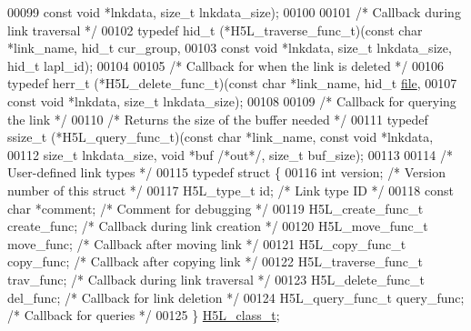 \begin{DoxyCode}
00099     \textcolor{keyword}{const} \textcolor{keywordtype}{void} *lnkdata, \textcolor{keywordtype}{size\_t} lnkdata\_size);
00100 
00101 \textcolor{comment}{/* Callback during link traversal */}
00102 \textcolor{keyword}{typedef} hid\_t (*H5L\_traverse\_func\_t)(\textcolor{keyword}{const} \textcolor{keywordtype}{char} *link\_name, hid\_t cur\_group,
00103     \textcolor{keyword}{const} \textcolor{keywordtype}{void} *lnkdata, \textcolor{keywordtype}{size\_t} lnkdata\_size, hid\_t lapl\_id);
00104 
00105 \textcolor{comment}{/* Callback for when the link is deleted */}
00106 \textcolor{keyword}{typedef} herr\_t (*H5L\_delete\_func\_t)(\textcolor{keyword}{const} \textcolor{keywordtype}{char} *link\_name, hid\_t \hyperlink{structfile}{file},
00107     \textcolor{keyword}{const} \textcolor{keywordtype}{void} *lnkdata, \textcolor{keywordtype}{size\_t} lnkdata\_size);
00108 
00109 \textcolor{comment}{/* Callback for querying the link */}
00110 \textcolor{comment}{/* Returns the size of the buffer needed */}
00111 \textcolor{keyword}{typedef} ssize\_t (*H5L\_query\_func\_t)(\textcolor{keyword}{const} \textcolor{keywordtype}{char} *link\_name, \textcolor{keyword}{const} \textcolor{keywordtype}{void} *lnkdata,
00112     \textcolor{keywordtype}{size\_t} lnkdata\_size, \textcolor{keywordtype}{void} *buf \textcolor{comment}{/*out*/}, \textcolor{keywordtype}{size\_t} buf\_size);
00113 
00114 \textcolor{comment}{/* User-defined link types */}
00115 \textcolor{keyword}{typedef} \textcolor{keyword}{struct }\{
00116     \textcolor{keywordtype}{int} version;                    \textcolor{comment}{/* Version number of this struct        */}
00117     H5L\_type\_t id;                  \textcolor{comment}{/* Link type ID                         */}
00118     \textcolor{keyword}{const} \textcolor{keywordtype}{char} *comment;            \textcolor{comment}{/* Comment for debugging                */}
00119     H5L\_create\_func\_t create\_func;  \textcolor{comment}{/* Callback during link creation        */}
00120     H5L\_move\_func\_t move\_func;      \textcolor{comment}{/* Callback after moving link           */}
00121     H5L\_copy\_func\_t copy\_func;      \textcolor{comment}{/* Callback after copying link          */}
00122     H5L\_traverse\_func\_t trav\_func;  \textcolor{comment}{/* Callback during link traversal       */}
00123     H5L\_delete\_func\_t del\_func;     \textcolor{comment}{/* Callback for link deletion           */}
00124     H5L\_query\_func\_t query\_func;    \textcolor{comment}{/* Callback for queries                 */}
00125 \} \hyperlink{struct_h5_l__class__t}{H5L\_class\_t};

\end{DoxyCode}
